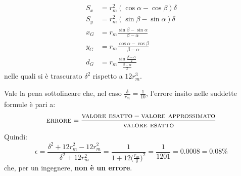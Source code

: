 \begin{align*}
S_x &= r_m^2(\cos\alpha-\cos\beta)\delta \\
S_y &= r_m^2(\sin\beta-\sin\alpha)\delta \\ 
x_G &= r_m\frac{\sin\beta-\sin\alpha}{\beta-\alpha} \\
y_G &= r_m\frac{\cos\alpha-\cos\beta}{\beta-\alpha} \\
d_G &= r_m\frac{\sin\frac{\beta-\alpha}{2}}{\frac{\beta-\alpha}{2}}
\end{align*}
nelle quali si è trascurato $\delta^2$ rispetto a $12r_m^3$. 

\noindent Vale la pena sottolineare che, nel caso $\frac{\delta}{r_m} = \frac{1}{10}$, l'errore insito nelle suddette formule è pari a:
\begin{equation*}
\textup{\textsc{errore}} = \frac{\textup{\textsc{valore esatto}}-\textup{\textsc{valore approssimato}}}{\textup{\textsc{valore esatto}}}
\end{equation*}
Quindi: 
\begin{equation*}
\epsilon = \frac{\delta^2+12r_m^2-12r_m^2}{\delta^2+12r_m^2} = \frac{1}{1+12\bigl(\frac{r_m}{\delta}\bigr)^2} = \frac{1}{1201} = 0.0008 = 0.08\%
\end{equation*}
che, per un ingegnere, \textbf{non è un errore}.